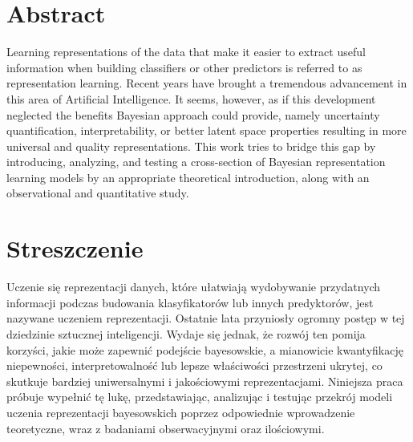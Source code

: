 \section*{Abstract}
Learning representations of the data that make it easier to extract useful information when building classifiers or other predictors is referred to as representation learning. Recent years have brought a tremendous advancement in this area of Artificial Intelligence. It seems, however, as if this development neglected the benefits Bayesian approach could provide, namely uncertainty quantification, interpretability, or better latent space properties resulting in more universal and quality representations. This work tries to bridge this gap by introducing, analyzing, and testing a cross-section of Bayesian representation learning models by an appropriate theoretical introduction, along with an observational and quantitative study.

\section*{Streszczenie}
Uczenie się reprezentacji danych, które ułatwiają wydobywanie przydatnych informacji podczas budowania klasyfikatorów lub innych predyktorów, jest nazywane uczeniem reprezentacji. Ostatnie lata przyniosły ogromny postęp w tej dziedzinie sztucznej inteligencji. Wydaje się jednak, że rozwój ten pomija korzyści, jakie może zapewnić podejście bayesowskie, a mianowicie kwantyfikację niepewności, interpretowalność lub lepsze właściwości przestrzeni ukrytej, co skutkuje bardziej uniwersalnymi i jakościowymi reprezentacjami. Niniejsza praca próbuje wypełnić tę lukę, przedstawiając, analizując i testując przekrój modeli uczenia reprezentacji bayesowskich poprzez odpowiednie wprowadzenie teoretyczne, wraz z badaniami obserwacyjnymi oraz ilościowymi.